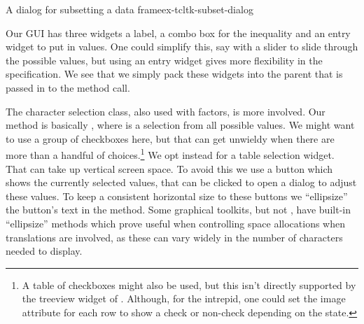 \begin{example}{A dialog for subsetting a data frame}{ex-tcltk-subset-dialog}
\begin{Schunk}
\begin{Sinput}
\end{Sinput}
\end{Schunk}
%

Our GUI has three widgets a label, a combo box for the inequality
and an entry widget to put in values. One could simplify this, say
with a slider to slide through the possible values, but using an
entry widget gives more flexibility in the specification. We see that
we simply pack these widgets into the parent that is passed in to the method call.
\begin{Schunk}
\end{Schunk}
%


The character selection class, also used with factors, is more
involved. Our  method is basically , where  is a selection from all possible
values.  We might want to use a group of checkboxes here, but that can
get unwieldy when there are more than a handful of
choices.\footnote{A table of checkboxes might also be used, but this
  isn't directly supported by the treeview widget of
  . Although, for the intrepid, one could set the image
  attribute for each row to show a check or non-check depending on the
  state.} We opt instead for a table selection widget. That can take
up vertical screen space. To avoid this we use a button which shows
the currently selected values, that can be clicked to open a dialog to
adjust these values. To keep a consistent horizontal size to these
buttons we ``ellipsize'' the button's text in the 
method. Some graphical toolkits, but not \Tk, have built-in
``ellipsize'' methods which prove useful when controlling space
allocations when translations are involved, as these can vary widely
in the number of characters needed to display.


\end{example}
